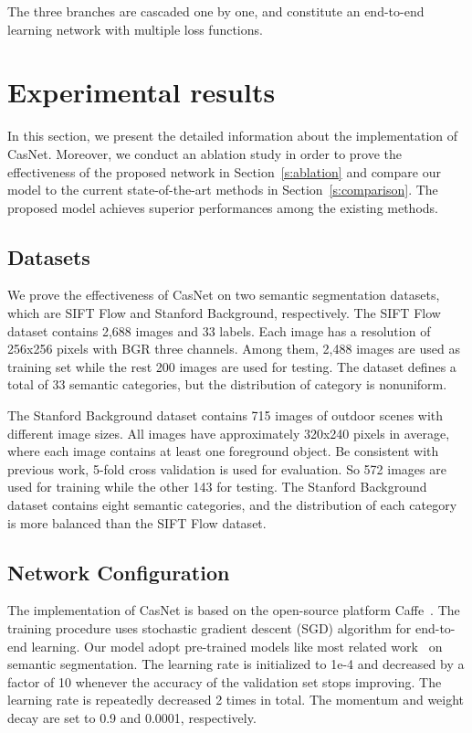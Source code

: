 \documentclass[10.5pt,compsoc]{TsT}
\newcommand{\upcite}[1]{\superscript{\textsuperscript{\cite{#1}}}}
\theoremstyle{mystyle}
\newcommand{\upcite}[1]{\textsuperscript{\cite{#1}}}
\begin{document}
{The three branches are cascaded one by one, and constitute an end-to-end learning network with multiple loss functions.


\section{Experimental results}
\label{s:results}
\noindent
In this section, we present the detailed information about the implementation of CasNet. 
Moreover, we conduct an ablation study in order to prove the effectiveness of the proposed network in Section~\ref{s:ablation} and compare our model to the current state-of-the-art methods in Section~\ref{s:comparison}. The proposed model achieves superior performances among the existing methods.

\subsection{Datasets}
\noindent
We prove the effectiveness of CasNet on two semantic segmentation datasets, which are SIFT Flow\upcite{6} and Stanford Background\upcite{7}, respectively. The SIFT Flow dataset contains 2,688 images and 33 labels. Each image has a resolution of   256x256 pixels with BGR three channels. Among them, 2,488 images are used as training set while the rest 200 images are used for testing. The dataset defines a total of 33 semantic categories, but the distribution of category is nonuniform.

The Stanford Background dataset contains 715 images of outdoor scenes with different image sizes. All images have approximately 320x240 pixels in average, where each image contains at least one foreground object. Be consistent with previous work, 5-fold cross validation is used for evaluation. So 572 images are used for training while the other 143 for testing. The Stanford Background dataset contains eight semantic categories, and the distribution of each category is more balanced than the SIFT Flow dataset.


\subsection{Network Configuration}
\noindent
The implementation of CasNet is based on the open-source platform Caffe~\upcite{23}. The training procedure uses stochastic gradient descent (SGD) algorithm for end-to-end learning. Our model adopt pre-trained models like most related work~\cite{21} on semantic segmentation. The learning rate is initialized to 1e-4 and decreased by a factor of 10 whenever the accuracy of the validation set stops improving. The learning rate is repeatedly decreased 2 times in total. The momentum and weight decay are set to 0.9 and 0.0001, respectively.

}
\end{document}
